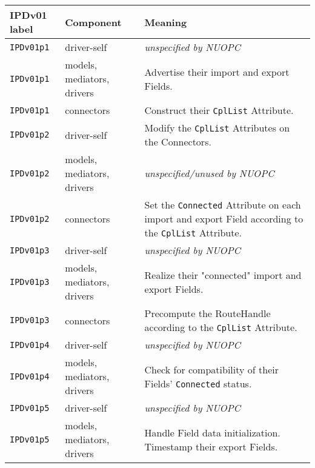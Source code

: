 \vspace*{3ex}
\begin{longtable}[h]{|p{35mm}|p{4cm}|p{6cm}|}
     \hline\hline
     {\bf IPDv01 label} & {\bf Component} & {\bf Meaning}\\
     \hline\hline
     {\tt IPDv01p1} & driver-self                 & {\em unspecified by NUOPC}\\ \hline
     {\tt IPDv01p1} & models, mediators, drivers  & Advertise their import and export Fields.\\ \hline
     {\tt IPDv01p1} & connectors                  & Construct their {\tt CplList} Attribute.\\ \hline
     {\tt IPDv01p2} & driver-self                 & Modify the {\tt CplList} Attributes on the Connectors.\\ \hline
     {\tt IPDv01p2} & models, mediators, drivers  & {\em unspecified/unused by NUOPC}\\ \hline
     {\tt IPDv01p2} & connectors                  & Set the {\tt Connected} Attribute on each import and export Field according to the {\tt CplList} Attribute.\\ \hline
     {\tt IPDv01p3} & driver-self                 & {\em unspecified by NUOPC}\\ \hline
     {\tt IPDv01p3} & models, mediators, drivers  & Realize their "connected" import and export Fields.\\ \hline
     {\tt IPDv01p3} & connectors                  & Precompute the RouteHandle according to the {\tt CplList} Attribute.\\ \hline
     {\tt IPDv01p4} & driver-self                 & {\em unspecified by NUOPC}\\ \hline
     {\tt IPDv01p4} & models, mediators, drivers  & Check for compatibility of their Fields' {\tt Connected} status.\\ \hline
     {\tt IPDv01p5} & driver-self                 & {\em unspecified by NUOPC}\\ \hline
     {\tt IPDv01p5} & models, mediators, drivers  & Handle Field data initialization. Timestamp their export Fields.\\
     \hline\hline
\end{longtable}

